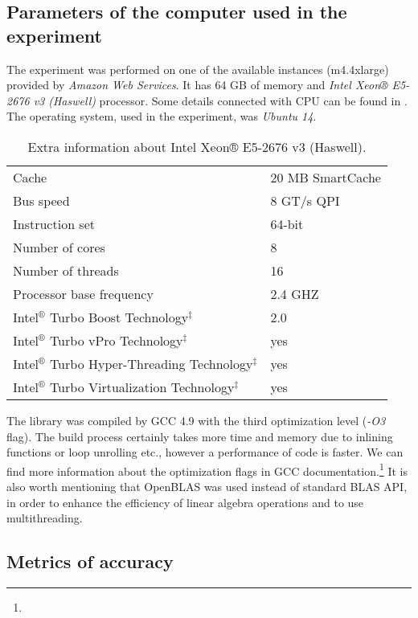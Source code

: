 \documentclass[english,a4paper,twoside]{ppfcmthesis}
\begin{document}
\subsection{Parameters of the computer used in the experiment}

The experiment was performed on one of the available instances (m4.4xlarge) provided by \textit{Amazon Web Services}. It has 64 GB of memory and \textit{Intel Xeon® E5-2676 v3 (Haswell)} processor. Some details connected with CPU can be found in . The operating system, used in the experiment, was \textit{Ubuntu 14}.

\begin{table}[h]
\centering
\caption{Extra information about Intel Xeon® E5-2676 v3 (Haswell).}
\label{tab:cpu}
    \begin{tabular}{l|l}
    & \\ \hline \hline
    Cache & 20 MB SmartCache \\
    Bus speed & 8 GT/s QPI \\
    Instruction set & 64-bit \\
    Number of cores & 8 \\
    Number of threads & 16 \\
    Processor base frequency & 2.4 GHZ \\
    Intel$^{®}$ Turbo Boost Technology$^{‡}$ & 2.0 \\
    Intel$^{®}$ Turbo vPro Technology$^{‡}$ & yes \\ 
    Intel$^{®}$ Turbo Hyper-Threading Technology$^{‡}$ & yes \\
    Intel$^{®}$ Turbo Virtualization Technology$^{‡}$ & yes
    \end{tabular}
\end{table}

The library was compiled by GCC 4.9 with the third optimization level (\textit{-O3} flag). The build process certainly takes more time and memory due to inlining functions or loop unrolling etc., however a performance of code is faster. We can find more information about the optimization flags in GCC documentation.\footnote{} It is also worth mentioning that OpenBLAS was used instead of standard BLAS API, in order to enhance the efficiency of linear algebra operations and to use multithreading. 

\subsection{Metrics of accuracy}\label{sec:metrics}
\end{document}
